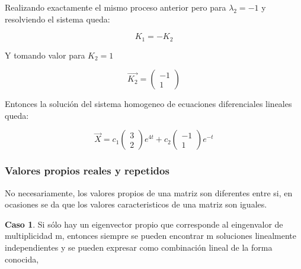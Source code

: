 \documentclass[titlepage]{article}
\begin{document}
      	Realizando exactamente el mismo proceso anterior pero para $\lambda_2 = -1$ y resolviendo el sistema queda:
      	
      		\begin{equation*}
      			K_1 = - K_2
      		\end{equation*}
      	
      	Y tomando valor para $K_2 = 1$
      		
      		\begin{equation*}
      			\vec{K_2} = 
      			\begin{pmatrix}
      				- 1\\
      				1	
      			\end{pmatrix}
      		\end{equation*}
      	
      	Entonces la solución del sistema homogeneo de ecuaciones diferenciales lineales queda:
      	
      	\begin{equation*}
      		\vec{X} = c_1
      		\begin{pmatrix}
      			3\\
      			2	
      		\end{pmatrix}
      		e^{4t} + c_2 
      		\begin{pmatrix}
      			- 1\\
      			1
      		\end{pmatrix}
      		e^{- t}
      	\end{equation*}
      
      		
      			
      		
      	
      	
      
      	  
      	 		
            \subsubsection{Valores propios reales y repetidos}
            
                No necesariamente, los valores propios de una matriz son diferentes entre si, en ocasiones se da que los valores caracteristicos de una matriz son iguales.\par\vspace{0.1cm}
                
                \textbf{Caso 1}. Si sólo hay un eigenvector propio que corresponde al eingenvalor de multiplicidad m, entonces siempre se pueden encontrar m soluciones linealmente independientes y se pueden expresar como combinación lineal de la forma conocida, \cite{Zill2002b}
                    
\end{document}
